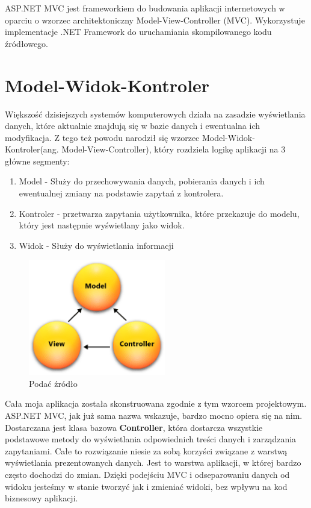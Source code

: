 ASP.NET MVC jest frameworkiem do budowania aplikacji internetowych w oparciu o wzorzec architektoniczny Model-View-Controller (MVC). Wykorzystuje implementacje .NET Framework do uruchamiania skompilowanego kodu źródłowego.


\section{Model-Widok-Kontroler}

Większość dzisiejszych systemów komputerowych działa na zasadzie wyświetlania danych, które aktualnie znajdują się w bazie danych i ewentualna ich modyfikacja. Z tego też powodu narodził się wzorzec Model-Widok-Kontroler(ang. Model-View-Controller), który rozdziela logikę aplikacji na 3 główne segmenty:
\begin{enumerate}
	\item Model - Służy do przechowywania danych, pobierania danych i ich ewentualnej zmiany na podstawie zapytań z kontrolera.
	\item Kontroler - przetwarza zapytania użytkownika, które przekazuje do modelu, który jest następnie wyświetlany jako widok.
	\item Widok - Służy do wyświetlania informacji 
\end{enumerate}

\begin{figure}[h]
	\centering
	\includegraphics[height=50.5mm]{images/mvc.png}
	 \caption{Podać źródło}
\end{figure}

Cała moja aplikacja została skonstruowana zgodnie z tym wzorcem projektowym. ASP.NET MVC, jak już sama nazwa wskazuje, bardzo mocno opiera się na nim. Dostarczana jest klasa bazowa \textbf{Controller}, która dostarcza wszystkie podstawowe metody do wyświetlania odpowiednich treści danych i zarządzania zapytaniami.
Całe to rozwiązanie niesie za sobą korzyści związane z warstwą wyświetlania prezentowanych danych. Jest to warstwa aplikacji, w której bardzo często dochodzi do zmian. Dzięki podejściu MVC i odseparowaniu danych od widoku jesteśmy w stanie tworzyć jak i zmieniać widoki, bez wpływu na kod biznesowy aplikacji.

